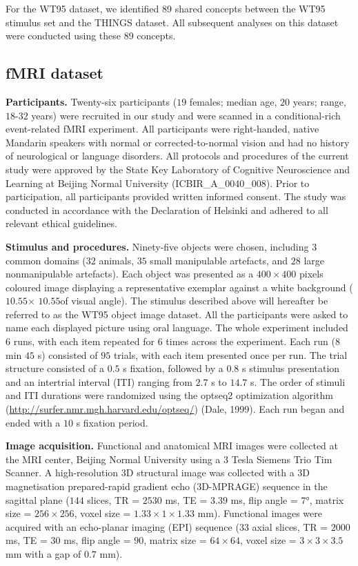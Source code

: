 \documentclass[pdflatex,sn-mathphys-num,lineno]{sn-jnl}%
\begin{document}
\begin{CJK}{UTF8}{gbsn}
For the WT95 dataset, we identified 89 shared concepts between the WT95 stimulus set and the THINGS dataset. All subsequent analyses on this dataset were conducted using these 89 concepts.

\subsection{fMRI dataset} 
\textbf{Participants.} Twenty-six participants ($19$ females; median age, $20$ years; range, $18$-$32$ years) were recruited in our study and were scanned in a conditional-rich event-related fMRI experiment. All participants were right-handed, native Mandarin speakers with normal or corrected-to-normal vision and had no history of neurological or language disorders. All protocols and procedures of the current study were approved by the State Key Laboratory of Cognitive Neuroscience and Learning at Beijing Normal University (ICBIR\_A\_0040\_008). Prior to participation, all participants provided written informed consent. The study was conducted in accordance with the Declaration of Helsinki and adhered to all relevant ethical guidelines.

\textbf{Stimulus and procedures.} Ninety-five objects were chosen, including $3$ common domains ($32$ animals, $35$ small manipulable artefacts, and $28$ large nonmanipulable artefacts). Each object was presented as a $400\times400$ pixels coloured image displaying a representative exemplar against a white background ($10.55$\textdegree $\times$ $10.55$\textdegree of visual angle). The stimulus described above will hereafter be referred to as the WT95 object image dataset. All the participants were asked to name each displayed picture using oral language. The whole experiment included $6$ runs, with each item repeated for $6$ times across the experiment. Each run ($8$ min $45$ s) consisted of $95$ trials, with each item presented once per run. The trial structure consisted of a $0.5$ s fixation, followed by a $0.8$ s stimulus presentation and an intertrial interval (ITI) ranging from $2.7$ s to $14.7$ s. The order of stimuli and ITI durations were randomized using the optseq2 optimization algorithm (\url{http://surfer.nmr.mgh.harvard.edu/optseq/}) (Dale, 1999). Each run began and ended with a $10$ s fixation period.

\textbf{Image acquisition.} Functional and anatomical MRI images were collected at the MRI center, Beijing Normal University using a $3$ Tesla Siemens Trio Tim Scanner. A high-resolution 3D structural image was collected with a 3D magnetisation prepared-rapid gradient echo (3D-MPRAGE) sequence in the sagittal plane ($144$ slices, TR = $2530$ ms, TE = $3.39$ ms, flip angle = $7$°, matrix size = $256\times256$, voxel size = $1.33\times 1\times1.33$ mm). Functional images were acquired with an echo-planar imaging (EPI) sequence (33 axial slices, TR = $2000$ ms, TE = $30$ ms, flip angle = $90$\textdegree, matrix size = $64\times64$, voxel size = $3\times3\times3.5$ mm with a gap of $0.7$ mm).


\end{CJK}
\end{document}
